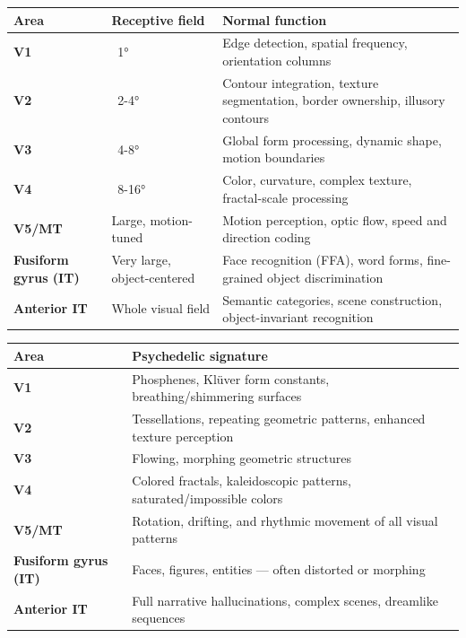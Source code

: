 \documentclass[11pt, twoside, openright]{book}
\begin{document}
\clearpage

\footnotesize\noindent
\begin{xltabular}{\linewidth}{>{\hsize}X X X}
\toprule
\textbf{Area} & \textbf{Receptive field} & \textbf{Normal function} \\
\midrule\endhead
\textbf{V1} & ~1° & Edge detection, spatial frequency, orientation columns \\[6pt]
\textbf{V2} & ~2-4° & Contour integration, texture segmentation, border ownership, illusory contours \\[6pt]
\textbf{V3} & ~4-8° & Global form processing, dynamic shape, motion boundaries \\[6pt]
\textbf{V4} & ~8-16° & Color, curvature, complex texture, fractal-scale processing \\[6pt]
\textbf{V5/\allowbreak{}MT} & Large, motion-tuned & Motion perception, optic flow, speed and direction coding \\[6pt]
\textbf{Fusiform gyrus (IT)} & Very large, object-centered & Face recognition (FFA), word forms, fine-grained object discrimination \\[6pt]
\textbf{Anterior IT} & Whole visual field & Semantic categories, scene construction, object-invariant recognition \\[6pt]
\bottomrule
\end{xltabular}
\normalsize
\clearpage
\footnotesize\noindent
\begin{xltabular}{\linewidth}{>{\hsize}X X}
\toprule
\textbf{Area} & \textbf{Psychedelic signature} \\
\midrule\endhead
\textbf{V1} & Phosphenes, Klüver form constants, breathing/\allowbreak{}shimmering surfaces \\[6pt]
\textbf{V2} & Tessellations, repeating geometric patterns, enhanced texture perception \\[6pt]
\textbf{V3} & Flowing, morphing geometric structures \\[6pt]
\textbf{V4} & Colored fractals, kaleidoscopic patterns, saturated/\allowbreak{}impossible colors \\[6pt]
\textbf{V5/\allowbreak{}MT} & Rotation, drifting, and rhythmic movement of all visual patterns \\[6pt]
\textbf{Fusiform gyrus (IT)} & Faces, figures, entities --- often distorted or morphing \\[6pt]
\textbf{Anterior IT} & Full narrative hallucinations, complex scenes, dreamlike sequences \\[6pt]
\bottomrule
\end{xltabular}
\normalsize
\end{document}

